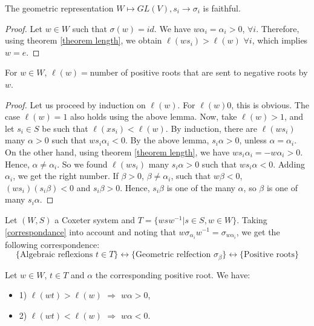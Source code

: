 \documentclass[envcountsame,envcountchap]{svmono}
\begin{document}
\begin{corollary}
The geometric representation $W \mapsto GL(V), s_i \to \sigma_i$ is faithful. 
\end{corollary}
\begin{proof}
Let $w \in W$ such that $\sigma(w) = id$. We have $w \alpha_i = \alpha_i > 0$, $\forall i$. Therefore, using theorem \ref{theorem length}, we obtain $\ell (w s_i) > \ell (w)$ $\forall i$, which implies $w = e$. 
\end{proof}

\begin{proposition}
For $w \in W$, $\ell (w) = $number of positive roots that are sent to negative roots by $w$.  
\end{proposition}
\begin{proof}
Let us proceed by induction on $\ell (w)$. For $\ell (w) 0$, this is obvious. The case $\ell (w) = 1$ also holds using the above lemma. Now, take $\ell (w) > 1$, and let $s_i\in S$ be such that $\ell (x s_i) < \ell (w)$. By induction, there are $\ell (w s_i)$ many $\alpha > 0$ such that $w s_i \alpha_i < 0$. By the above lemma, $s_i \alpha > 0$, unless $ \alpha = \alpha_i$. On the other hand, using theorem \ref{theorem length}, we have $w s_i \alpha_i = - w \alpha_i > 0$. Hence, $\alpha \neq \alpha_i$. So we found $\ell (w s_i)$ many $s_i \alpha > 0$ such that $ws_i \alpha < 0$. Adding $\alpha_i$, we get the right number. If $\beta > 0$, $\beta \neq \alpha_i$, such that $w \beta < 0$, $(w s_i)(s_i \beta) < 0$ and $s_i \beta > 0$. Hence, $s_i \beta$ is one of the many $\alpha$, so $\beta$ is one of many $s_i \alpha$.
\end{proof}

\begin{remark}
Let $(W, S)$ a Coxeter system and $T = \{ w s w^{-1} | s \in S, w \in W \}$. Taking \eqref{correspondance} into account and noting that $w \sigma_{\alpha_i} w^{-1} = \sigma_{w \alpha_i}$, we get the following correspondence: 
\begin{equation}
\{ \text{Algebraic reflexions } t\in T \} \leftrightarrow \{\text{Geometric relfection }\sigma_\beta \} \leftrightarrow \{\text{Positive roots} \}
\end{equation}
\end{remark}

\begin{proposition}
Let $w \in W$, $t \in T$ and $\alpha$ the corresponding positive root. We have:
\begin{itemize}
\item 1) $\ell (wt) > \ell (w)$ $\Rightarrow$ $w \alpha > 0$,
\item 2) $\ell (wt) < \ell (w)$ $\Rightarrow$ $w \alpha < 0$. 
\end{itemize}
\end{proposition}
\end{document}

